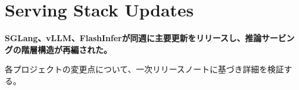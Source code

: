 \section{Serving Stack Updates}
\noindent\textbf{SGLang、vLLM、FlashInferが同週に主要更新をリリースし、推論サービングの階層構造が再編された。}\par\medskip
各プロジェクトの変更点について、一次リリースノートに基づき詳細を検証する。
